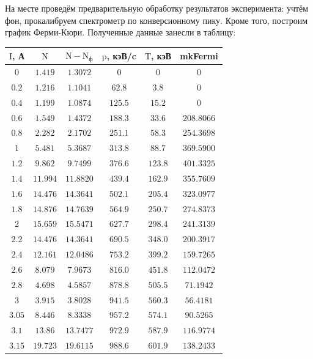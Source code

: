 \documentclass[a4paper, 12pt]{article}%
\begin{document}
	На месте проведём предварительную обработку результатов эксперимента: учтём фон, прокалибруем спектрометр по конверсионному пику. Кроме того, построим график Ферми-Кюри.
	Полученные данные занесли в таблицу:
	
	\begin{table}[!h]
	\centering
	\begin{tabular}{|c|c|c|c|c|c|}
\hline $\mathrm{I}$, А & $\mathrm{N}$ & $\mathrm{N}-\mathrm{N}_{\text{ф}}$ & $\mathrm{p}$, кэВ/c & $\mathrm{T}$, кэВ & mkFermi \\
\hline 0 & $1.419$ & $1.3072$ & 0 & 0 & 0 \\
\hline $0.2$ & $1.216$ & $1.1041$ & $62.8$ & $3.8$ & 0 \\
\hline $0.4$ & $1.199$ & $1.0874$ & $125.5$ & $15.2$ & 0 \\
\hline $0.6$ & $1.549$ & $1.4372$ & $188.3$ & $33.6$ & $208.8066$ \\
\hline $0.8$ & $2.282$ & $2.1702$ & $251.1$ & $58.3$ & $254.3698$ \\
\hline 1 & $5.481$ & $5.3687$ & $313.8$ & $88.7$ & $369.5900$ \\
\hline $1.2$ & $9.862$ & $9.7499$ & $376.6$ & $123.8$ & $401.3325$ \\
\hline $1.4$ & $11.994$ & $11.8820$ & $439.4$ & $162.9$ & $355.7609$ \\
\hline $1.6$ & $14.476$ & $14.3641$ & $502.1$ & $205.4$ & $323.0977$ \\
\hline $1.8$ & $14.876$ & $14.7639$ & $564.9$ & $250.7$ & $274.8373$ \\
\hline 2 & $15.659$ & $15.5471$ & $627.7$ & $298.4$ & $241.3139$ \\
\hline $2.2$ & $14.476$ & $14.3641$ & $690.5$ & $348.0$ & $200.3917$ \\
\hline $2.4$ & $12.161$ & $12.0486$ & $753.2$ & $399.2$ & $159.7265$ \\
\hline $2.6$ & $8.079$ & $7.9673$ & $816.0$ & $451.8$ & $112.0472$ \\
\hline $2.8$ & $4.698$ & $4.5857$ & $878.8$ & $505.5$ & $71.1942$ \\
\hline 3 & $3.915$ & $3.8028$ & $941.5$ & $560.3$ & $56.4181$ \\
\hline $3.05$ & $8.446$ & $8.3338$ & $957.2$ & $574.1$ & $90.5265$ \\
\hline $3.1$ & $13.86$ & $13.7477$ & $972.9$ & $587.9$ & $116.9774$ \\
\hline $3.15$ & $19.723$ & $19.6115$ & $988.6$ & $601.9$ & $138.2433$ \\

\end{tabular}
\end{table}
\end{document}

